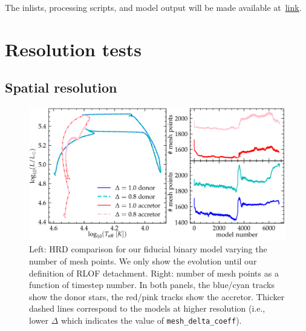 \documentclass[twocolumn,twocolappendix,trackchanges]{aastex63}
\begin{document}
The inlists, processing scripts, and model output will be made available at~\href{link}{link}.


\section{Resolution tests}
\label{sec:res_tests}
\subsection{Spatial resolution}

\begin{figure}[htbp]
  \centering
  \includegraphics[width=\textwidth]{spatial_res_plot}
  \caption{Left: HRD comparison for our fiducial binary model varying
  the number of mesh points. We only show the evolution until our definition
  of RLOF detachment. Right: number of mesh points as a
  function of timestep number. In both panels, the blue/cyan tracks show the donor stars, the
red/pink tracks show the accretor. Thicker dashed lines correspond to
the models at higher resolution (i.e., lower $\Delta$ which indicates
the value of \texttt{mesh\_delta\_coeff}).}
\end{figure}




\end{document}
